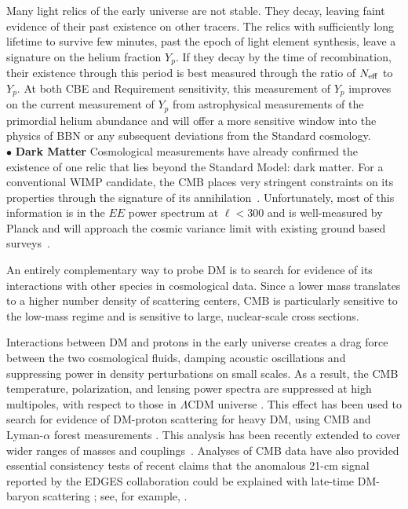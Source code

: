 \documentclass[PICOReport.tex]{subfiles}
\begin{document}
Many light relics of the early universe are not stable. They decay, leaving faint evidence of their past existence on other tracers. The relics with sufficiently long lifetime to survive few minutes, past the epoch of light element synthesis, leave a signature on the helium fraction $Y_p$.  If they decay by the time of recombination, their existence through this period is best measured through the ratio of ${N_{\rm eff}}$ to $Y_p$. At both CBE and Requirement sensitivity, this measurement of $Y_p$ improves on the current measurement of $Y_p$ from astrophysical measurements of the primordial helium abundance and will offer a more sensitive window into the physics of BBN or any subsequent deviations from the Standard cosmology. 
 \\
$\bullet$ {\bf Dark Matter} \hspace{0.1in} Cosmological measurements have already confirmed the existence of one relic that lies beyond the Standard Model: dark matter. For a conventional WIMP candidate, the CMB places very stringent constraints on its properties through the signature of its annihilation~\cite{Peebles:2000pn, Chen:2003gz, Padmanabhan:2005es}. Unfortunately, most of this information is in the $EE$ power spectrum at $\ell < 300$ and is well-measured by Planck and will approach the cosmic variance limit with existing ground based surveys~\cite{Madhavacheril:2013cna,Green:2018pmd}.

An entirely complementary way to probe DM is to search for evidence of its interactions with other species in cosmological data. Since a lower mass translates to a higher number density of scattering centers, CMB is particularly sensitive to the low-mass regime and is sensitive to large, nuclear-scale cross sections. 
 
Interactions between DM and protons in the early universe creates a drag force between the two cosmological fluids, damping acoustic oscillations and suppressing power in density perturbations on small scales. As a result, the CMB temperature, polarization, and lensing power spectra are suppressed at high multipoles, with respect to those in $\Lambda$CDM universe . This effect has been used to search for evidence of DM-proton scattering for heavy DM, using CMB and Lyman-$\alpha$ forest measurements \cite{2002astro.ph..2496C,2004PhRvD..70h3501S,Dvorkin:2013cea}. This analysis has been recently extended to cover wider ranges of masses and couplings~\cite{2018PhRvL.121h1301G,2018arXiv180108609B,2018PhRvD..97j3530X,2018arXiv180800001B,2018PhRvD..98b3013S,2018PhRvD..97j3530X,2018arXiv180800001B}.  Analyses of CMB data have also provided essential consistency tests of recent claims that the anomalous 21-cm signal reported by the EDGES collaboration \cite{2018Natur.555...67B} could be explained with late-time DM-baryon scattering \cite{2018Natur.555...71B}; see, for example, \cite{2018arXiv180711482K,2018PhRvD..98b3013S}. 
\end{document}
